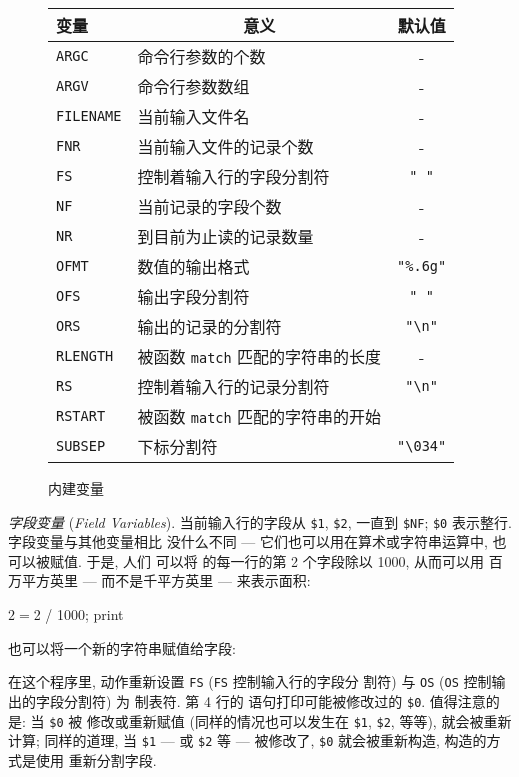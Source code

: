 \begin{figure}[ht]
\captionsetup{type=table}
\caption{内建变量}
\label{tbl:built_in_variables}
\begin{center}
\begin{tabular}{l|l|c}
	\hline
	\hline
	变量	& \multicolumn{1}{c}{意义}	& 默认值 \\
	\hline
	\verb'ARGC'	& 命令行参数的个数	& - \\
	\verb'ARGV'	& 命令行参数数组	& - \\
	\verb'FILENAME'	& 当前输入文件名	& - \\
	\verb'FNR'	& 当前输入文件的记录个数& - \\
	\verb'FS'	& 控制着输入行的字段分割符 & \verb'" "' \\
	\verb'NF'	& 当前记录的字段个数	& - \\
	\verb'NR'	& 到目前为止读的记录数量 & - \\
	\verb'OFMT'	& 数值的输出格式	& \verb'"%.6g"' \\
	\verb'OFS'	& 输出字段分割符	& \verb'" "' \\
	\verb'ORS'	& 输出的记录的分割符	& \verb'"\n"'	\\
	\verb'RLENGTH'	& 被函数 \verb'match' 匹配的字符串的长度 & - \\
	\verb'RS'	& 控制着输入行的记录分割符 & \verb'"\n"'	\\
	\verb'RSTART'	& 被函数 \verb'match' 匹配的字符串的开始 \\
	\verb'SUBSEP'	& 下标分割符	& \verb'"\034"'	\\
	\hline
\end{tabular}
\end{center}
\end{figure}

\emph{字段变量} (\emph{Field Variables}). 当前输入行的字段从 \verb'$1',
\verb'$2', 一直到 \verb'$NF'; \verb'$0' 表示整行. 字段变量与其他变量相比
没什么不同 --- 它们也可以用在算术或字符串运算中, 也可以被赋值. 于是, 人们
可以将  的每一行的第 2 个字段除以 1000, 从而可以用
百万平方英里 --- 而不是千平方英里 --- 来表示面积:
\begin{awkcode}
    { $2 = $2 / 1000; print }
\end{awkcode}
也可以将一个新的字符串赋值给字段:
在这个程序里, \BEGIN 动作重新设置 \verb'FS' (\verb'FS' 控制输入行的字段分
割符) 与 \verb'OS' (\verb'OS' 控制输出的字段分割符) 为 制表符. 第 4 行的
\print 语句打印可能被修改过的 \verb'$0'. 值得注意的是: 当 \verb'$0' 被
修改或重新赋值 (同样的情况也可以发生在 \verb'$1', \verb'$2', 等等), \nf 
就会被重新计算; 同样的道理, 当 \verb'$1' --- 或 \verb'$2' 等 --- 被修改了,
\verb'$0' 就会被重新构造, 构造的方式是使用 \OFS 重新分割字段.

